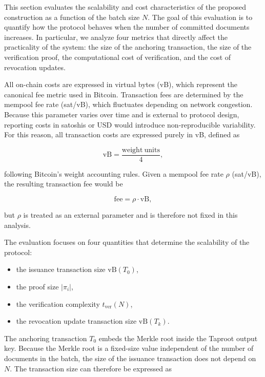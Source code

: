 \documentclass{IEEEoj}
\begin{document}
This section evaluates the scalability and cost characteristics of the proposed construction as a function of the batch size $N$. 
The goal of this evaluation is to quantify how the protocol behaves when the number of committed documents increases. 
In particular, we analyze four metrics that directly affect the practicality of the system: the size of the anchoring transaction, the size of the verification proof, the computational cost of verification, and the cost of revocation updates.

All on-chain costs are expressed in virtual bytes (vB), which represent the canonical fee metric used in Bitcoin. 
Transaction fees are determined by the mempool fee rate (sat/vB), which fluctuates depending on network congestion. Because this parameter varies over time and is external to protocol design, reporting costs in satoshis or USD would introduce non-reproducible variability. 
For this reason, all transaction costs are expressed purely in vB, defined as

\begin{equation}
\mathrm{vB} = \frac{\mathrm{weight\ units}}{4},
\end{equation}

following Bitcoin's weight accounting rules. 
Given a mempool fee rate $\rho$ (sat/vB), the resulting transaction fee would be

\begin{equation}
\mathrm{fee} = \rho \cdot \mathrm{vB},
\end{equation}

but $\rho$ is treated as an external parameter and is therefore not fixed in this analysis.

The evaluation focuses on four quantities that determine the scalability of the protocol:

\begin{itemize}
\item the issuance transaction size $\mathrm{vB}(T_0)$,
\item the proof size $|\pi_i|$,
\item the verification complexity $t_{\mathrm{ver}}(N)$,
\item the revocation update transaction size $\mathrm{vB}(T_k)$.
\end{itemize}

The anchoring transaction $T_0$ embeds the Merkle root inside the Taproot output key. 
Because the Merkle root is a fixed-size value independent of the number of documents in the batch, the size of the issuance transaction does not depend on $N$. 
The transaction size can therefore be expressed as
\end{document}
